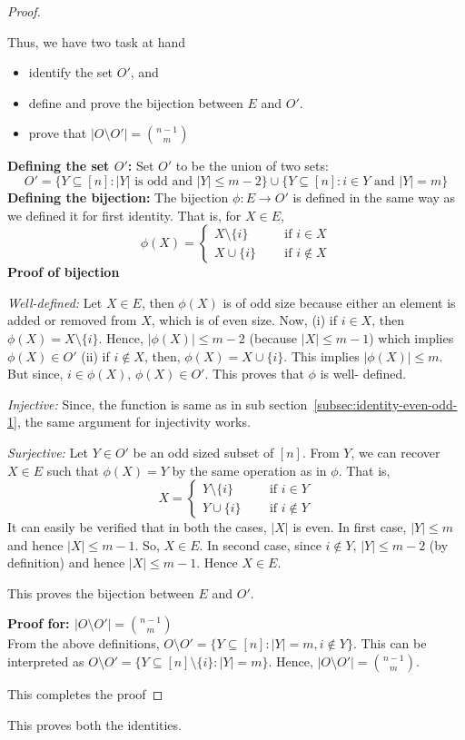 \begin{proof}
\begin{description}
Thus, we have two task at hand
\begin{itemize}
    \item identify the set $O'$, and
    \item define and prove the bijection between $E$ and $O'$.
    \item prove that $|O\setminus O'| = {n-1\choose m}$
\end{itemize}
\textbf{Defining the set $O'$:} Set $O'$ to be the union of two sets: 
$$O' = \{Y\subseteq [n]: |Y| \text{ is odd and } |Y|\le m-2\}\cup\{Y\subseteq [n]: i\in Y \text{ and } |Y| = m\}$$
\textbf{Defining the bijection:} The bijection $\phi:E\rightarrow O'$ is defined in the same way as we defined it for first identity. That is, for $X\in E$,
\[
\phi(X) = 
\begin{cases}
X\setminus \{i\} & ~~~~~\text{ if } i\in X\\
X\cup\{i\} & ~~~~~\text{ if } i\not\in X
\end{cases}
\]
\textbf{Proof of bijection}
\begin{description}
\item \textit{Well-defined:} Let $X\in E$, then $\phi(X)$ is of odd size because either an element is added or removed from $X$, which is of even size. Now, (i) if $i\in X$, then $\phi(X) = X\setminus\{i\}$. Hence, $|\phi(X)|\le m-2$ (because $|X|\le m-1$) which implies $\phi(X)\in O'$ (ii) if $i\not\in X$, then, $\phi(X) = X\cup \{i\}$. This implies $|\phi(X)| \le m$. But since, $i\in \phi(X)$, $\phi(X)\in O'$. This proves that $\phi$ is well- defined.
\item \textit{Injective:} Since, the function is same as in sub section~\ref{subsec:identity-even-odd-1}, the same argument for injectivity works.
\item \textit{Surjective:} Let $Y\in O'$ be an odd sized subset of $[n]$. From $Y$, we can recover $X\in E$ such that $\phi(X) = Y$ by the same operation as in $\phi$. That is, 
 \[
 X= 
 \begin{cases}
Y\setminus \{i\} & ~~~~~\text{ if } i\in Y\\
Y\cup\{i\} & ~~~~~\text{ if } i\not\in Y
 \end{cases}
 \]
 It can easily be verified that in both the cases, $|X|$ is even. 
 In first case, $|Y|\le m$ and hence $|X|\le m-1$. So, $X\in E$. In second case, since $i\not\in Y$, $|Y|\le m-2$ (by definition) and hence $|X|\le m-1$. Hence $X\in E$.
\end{description}
This proves the bijection between $E$ and $O'$. 

\textbf{Proof for: $|O\setminus O'| = {n-1\choose m}$}\\
From the above definitions, $O\setminus O' = \{Y\subseteq [n]: |Y| = m, i\not\in Y\}$. This can be interpreted as $O\setminus O' = \{Y\subseteq [n]\setminus \{i\}: |Y| = m\}$. Hence, $|O\setminus O'| = {n-1\choose m}$.
\end{description}
This completes the proof
\end{proof}
This proves both the identities.
